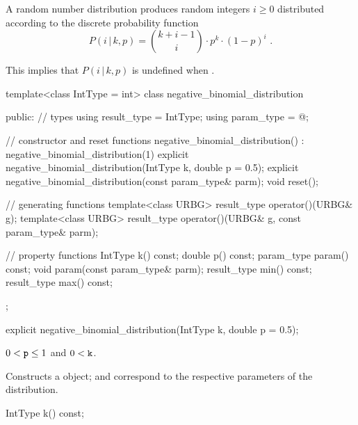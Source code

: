 \pnum
A  random number distribution
produces random integers $i \geq 0$
distributed according to
the discrete probability function
%
%
\[ P(i\,|\,k,p) = \binom{k+i-1}{i} \cdot p^k \cdot (1-p)^i \text{ .} \]
\begin{note}
This implies that $P(i\,|\,k,p)$ is undefined when .
\end{note}

%
\begin{codeblock}
template<class IntType = int>
  class negative_binomial_distribution {
  public:
    // types
    using result_type = IntType;
    using param_type  = @\unspec@;

    // constructor and reset functions
    negative_binomial_distribution() : negative_binomial_distribution(1) {}
    explicit negative_binomial_distribution(IntType k, double p = 0.5);
    explicit negative_binomial_distribution(const param_type& parm);
    void reset();

    // generating functions
    template<class URBG>
      result_type operator()(URBG& g);
    template<class URBG>
      result_type operator()(URBG& g, const param_type& parm);

    // property functions
    IntType k() const;
    double p() const;
    param_type param() const;
    void param(const param_type& parm);
    result_type min() const;
    result_type max() const;
  };
\end{codeblock}


%
\begin{itemdecl}
explicit negative_binomial_distribution(IntType k, double p = 0.5);
\end{itemdecl}

\begin{itemdescr}
\pnum\requires
 $0 < \texttt{p} \leq 1$
 and $0 < \texttt{k} $.

\pnum\effects Constructs a  object;
  and 
 correspond to the respective parameters of the distribution.
\end{itemdescr}

%
\begin{itemdecl}
IntType k() const;
\end{itemdecl}

